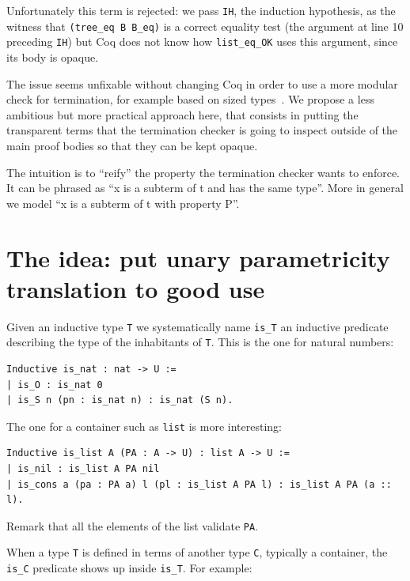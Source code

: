 \documentclass[a4paper,UKenglish,cleveref, autoref]{lipics-v2019}
\begin{document}
\noindent
Unfortunately this term is rejected: we
pass \lstinline+IH+, the induction hypothesis, as the
witness that \lstinline+(tree_eq B B_eq)+ is a correct equality test
(the argument at line 10 preceding \lstinline+IH+) but Coq does not
know how 
\lstinline+list_eq_OK+ uses this argument, since its body is opaque.

The issue seems unfixable without changing Coq in order to use a more
modular check for termination, for example based on sized
types~\cite{sacchini:pastel-00622429}.
We propose a less ambitious but more practical approach here, that
consists in putting the transparent terms that the termination checker
is going to inspect outside of the main proof bodies so that they can be 
kept opaque.

The intuition is to ``reify'' the property the termination checker wants
to enforce. It can be phrased as ``x is a subterm of t and has the same
type''. More in general we model ``x is a subterm of t with property
P''.

\section{The idea: put unary parametricity translation to good use}
\label{sec:idea}

Given an inductive type \lstinline+T+ we systematically name \lstinline+is_T+
an inductive predicate describing the type of the inhabitants of
\lstinline+T+. This is the one for natural numbers:

\begin{lstlisting}
Inductive is_nat : nat -> U :=
| is_O : is_nat 0
| is_S n (pn : is_nat n) : is_nat (S n).
\end{lstlisting}

\noindent
The one for a container such as \lstinline+list+ is more interesting:

\begin{lstlisting}
Inductive is_list A (PA : A -> U) : list A -> U :=
| is_nil : is_list A PA nil
| is_cons a (pa : PA a) l (pl : is_list A PA l) : is_list A PA (a :: l).
\end{lstlisting}

\noindent
Remark that all the elements of the list validate \lstinline+PA+.

When a type \lstinline+T+ is defined in terms of another type
\lstinline+C+, typically a container, the \lstinline+is_C+ predicate
shows up inside \lstinline+is_T+. For example:
\end{document}
